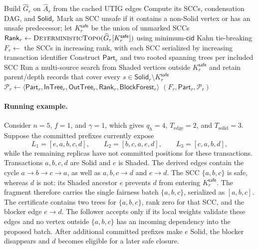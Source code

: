 \begin{algorithm}[h!]
\caption{\textsc{SafeExtract}: Safe Extraction and Structural Certification}
\label{alg:safe-extract}
\footnotesize
{}
Build $\widehat G_r$ on $\widehat A_r$ from the cached UTIG edges\;
Compute its SCCs, condensation DAG, and $\mathsf{Solid}_r$\;
Mark an SCC unsafe if it contains a non-Solid vertex or has an unsafe
predecessor; let $K_r^{\mathsf{safe}}$ be the union of unmarked SCCs\;
$\mathsf{Rank}_r\gets\textsc{DeterministicTopo}
  (\widehat G_r[K_r^{\mathsf{safe}}])$ using minimum-$\mathsf{cid}$
  Kahn tie-breaking\;
$F_r\gets$ the SCCs in increasing rank, with each SCC serialized by
increasing transaction identifier\;
Construct $\mathsf{Part}_r$ and two rooted spanning trees per included SCC\;
Run a multi-source search from Shaded vertices outside
$K_r^{\mathsf{safe}}$ and retain parent/depth records that cover every
$s\in\mathsf{Solid}_r\setminus K_r^{\mathsf{safe}}$\;
$\mathcal P_r\gets\langle\mathsf{Part}_r,\mathsf{InTree}_r,
 \mathsf{OutTree}_r,\mathsf{Rank}_r,\mathsf{BlockForest}_r\rangle$\;
\KwRet $(F_r,\mathsf{Part}_r,\mathcal P_r)$
\end{algorithm}

\paragraph{Running example.}
Consider $n=5$, $f=1$, and $\gamma=1$, which gives $q_h=4$,
$T_{\mathrm{edge}}=2$, and $T_{\mathrm{solid}}=3$.  Suppose the committed
prefixes currently expose
\[
 L_1=[e,a,b,c,d],\qquad
 L_2=[b,c,a,e,d],\qquad
 L_3=[c,a,b,d],
\]
while the remaining replicas have not committed positions for these
transactions.  Transactions $a,b,c,d$ are Solid and $e$ is Shaded.  The
derived edges contain the cycle $a\to b\to c\to a$, as well as
$a,b,c\to d$ and $e\to d$.  The SCC $\{a,b,c\}$ is safe, whereas $d$ is not:
its Shaded ancestor $e$ prevents $d$ from entering
$K_r^{\mathsf{safe}}$.  The fragment therefore carries the single fairness
batch $\{a,b,c\}$, serialized as $[a,b,c]$.  The certificate contains two
trees for $\{a,b,c\}$, rank zero for that SCC, and the blocker edge
$e\to d$.  The follower accepts only if its local weights validate these
edges and no vertex outside $\{a,b,c\}$ has an incoming dependency into the
proposed batch.  After additional committed prefixes make $e$ Solid, the
blocker disappears and $d$ becomes eligible for a later safe closure.

